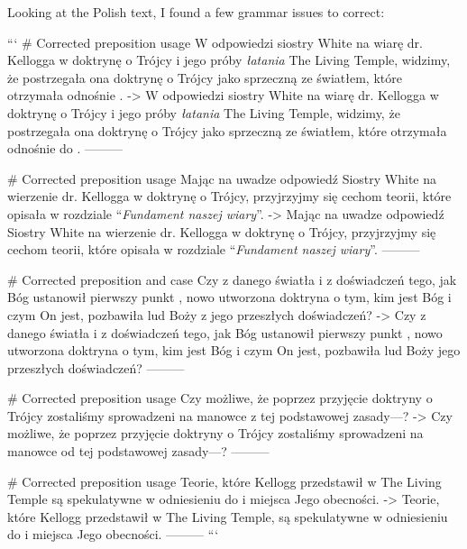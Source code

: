 Looking at the Polish text, I found a few grammar issues to correct:

```
# Corrected preposition usage
W odpowiedzi siostry White na wiarę dr. Kellogga w doktrynę o Trójcy i jego próby \textit{łatania} The Living Temple, widzimy, że postrzegała ona doktrynę o Trójcy jako sprzeczną ze światłem, które otrzymała odnośnie .
->
W odpowiedzi siostry White na wiarę dr. Kellogga w doktrynę o Trójcy i jego próby \textit{łatania} The Living Temple, widzimy, że postrzegała ona doktrynę o Trójcy jako sprzeczną ze światłem, które otrzymała odnośnie do .
---------

# Corrected preposition usage
Mając na uwadze odpowiedź Siostry White na wierzenie dr. Kellogga w doktrynę o Trójcy, przyjrzyjmy się cechom teorii, które opisała w rozdziale “\textit{Fundament naszej wiary}”.
->
Mając na uwadze odpowiedź Siostry White na wierzenie dr. Kellogga w doktrynę o Trójcy, przyjrzyjmy się cechom teorii, które opisała w rozdziale “\textit{Fundament naszej wiary}”.
---------

# Corrected preposition and case
Czy z danego światła i z doświadczeń tego, jak Bóg ustanowił pierwszy punkt , nowo utworzona doktryna o tym, kim jest Bóg i czym On jest, pozbawiła lud Boży z jego przeszłych doświadczeń?
->
Czy z danego światła i z doświadczeń tego, jak Bóg ustanowił pierwszy punkt , nowo utworzona doktryna o tym, kim jest Bóg i czym On jest, pozbawiła lud Boży jego przeszłych doświadczeń?
---------

# Corrected preposition usage
Czy możliwe, że poprzez przyjęcie doktryny o Trójcy zostaliśmy sprowadzeni na manowce z tej podstawowej zasady—?
->
Czy możliwe, że poprzez przyjęcie doktryny o Trójcy zostaliśmy sprowadzeni na manowce od tej podstawowej zasady—?
---------

# Corrected preposition usage
Teorie, które Kellogg przedstawił w The Living Temple są spekulatywne w odniesieniu do  i miejsca Jego obecności.
->
Teorie, które Kellogg przedstawił w The Living Temple, są spekulatywne w odniesieniu do  i miejsca Jego obecności.
---------
```